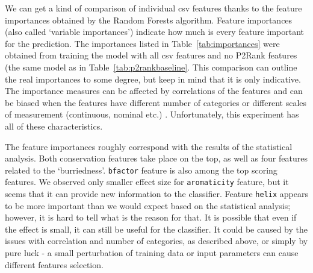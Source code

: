 We can get a kind of comparison of individual csv features thanks to the feature importances obtained by the Random Forests algorithm. Feature importances (also called `variable importances') indicate how much is every feature important for the prediction. The importances listed in Table~\ref{tab:importances} were obtained from training the model with all csv features and no P2Rank features (the same model as in Table~\ref{tab:p2rankbaseline}. This comparison can outline the real importances to some degree, but keep in mind that it is only indicative. The importance measures can be affected by correlations of the features \cite{variableimportance} and can be biased when the features have different number of categories or different scales of measurement (continuous, nominal etc.)  \cite{bias_importance}. Unfortunately, this experiment has all of these characteristics.

The feature importances roughly correspond with the results of the statistical analysis. Both conservation features take place on the top, as well as four features related to the `burriedness'. \texttt{bfactor} feature is also among the top scoring features. We observed only smaller effect size for \texttt{aromaticity} feature, but it seems that it can provide new information to the classifier. Feature \texttt{helix} appears to be more important than we would expect based on the statistical analysis; however, it is hard to tell what is the reason for that. It is possible that even if the effect is small, it can still be useful for the classifier. It could be caused by the issues with correlation and number of categories, as described above, or simply by pure luck - a small perturbation of training data or input parameters can cause different features selection.


